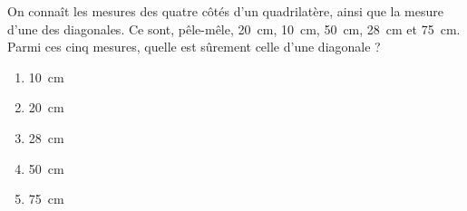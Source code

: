 On connaît les mesures des quatre côtés d'un quadrilatère, ainsi que
la mesure d'une des diagonales. Ce sont, pêle-mêle, 20~cm, 10~cm,
50~cm, 28~cm et 75~cm. Parmi ces cinq mesures, quelle est sûrement
celle d'une diagonale ?
\begin{multicols}{5}
  \begin{enumerate}[A/]
  \item 10~cm
  \item 20~cm
  \item 28~cm
  \item 50~cm
  \item 75~cm
  \end{enumerate}
\end{multicols}